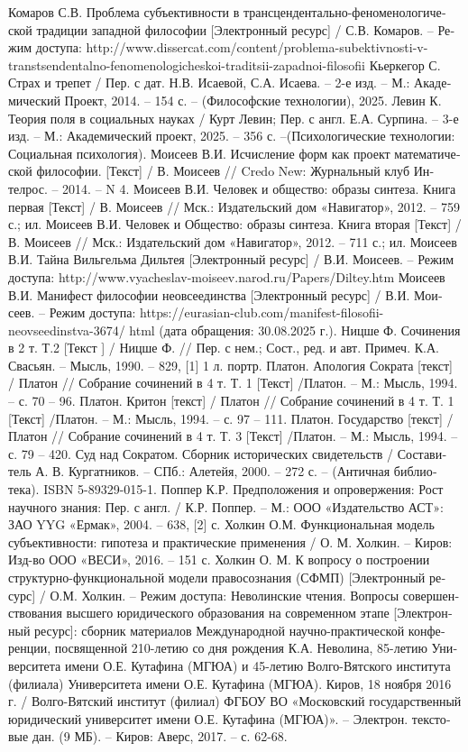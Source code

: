 \begin{russian}
    Комаров С.В. Проблема субъективности в трансцендентально-феноменологической традиции западной философии [Электронный ресурс] / С.В. Комаров. – Режим доступа: http://www.dissercat.com/content/problema-subektivnosti-v-transtsendentalno-fenomenologicheskoi-traditsii-zapadnoi-filosofii
    Кьеркегор С. Страх и трепет / Пер. с дат. Н.В. Исаевой, С.А. Исаева. – 2-е изд. – М.: Академический Проект, 2014. – 154 с. – (Философские технологии), 2025.
    Левин К. Теория поля в социальных науках / Курт Левин; Пер. с англ. Е.А. Сурпина. – 3-е изд.  – М.: Академический проект, 2025. – 356 с. –(Психологические технологии: Социальная психология).  
    Моисеев В.И. Исчисление форм как проект математической философии. [Текст] / В. Моисеев // Credo New: Журнальный клуб Интелрос. – 2014. – N 4.
    Моисеев В.И. Человек и общество: образы синтеза. Книга первая [Текст] / В. Моисеев // Мск.: Издательский дом «Навигатор», 2012. – 759 с.; ил.
    Моисеев В.И. Человек и Общество: образы синтеза. Книга вторая [Текст] / В. Моисеев // Мск.: Издательский дом «Навигатор», 2012. – 711 с.; ил.
    Моисеев В.И. Тайна Вильгельма Дильтея [Электронный ресурс] / В.И. Моисеев. – Режим доступа:  http://www.vyacheslav-moiseev.narod.ru/Papers/Diltey.htm
    Моисеев В.И. Манифест философии неовсеединства [Электронный ресурс] / В.И. Моисеев. – Режим доступа: https://eurasian-club.com/manifest-filosofii-neovseedinstva-3674/ html (дата обращения: 30.08.2025 г.).
    Ницше Ф. Сочинения в 2 т. Т.2 [Текст ] / Ницше Ф. // Пер. с нем.; Сост., ред. и авт. Примеч. К.А. Свасьян. – Мысль, 1990. – 829, [1] 1 л. портр.
    Платон. Апология Сократа [текст] / Платон // Собрание сочинений в 4 т. Т. 1 [Текст] /Платон. – М.: Мысль, 1994. – с. 70 – 96.
    Платон. Критон [текст] / Платон // Собрание сочинений в 4 т. Т. 1 [Текст] /Платон. – М.: Мысль, 1994. – с. 97 – 111.
    Платон. Государство [текст] / Платон // Собрание сочинений в 4 т. Т. 3 [Текст] /Платон. – М.: Мысль, 1994. – с. 79 – 420.
    Суд над Сократом. Сборник исторических свидетельств / Составитель    А. В. Кургатников. – СПб.: Алетейя, 2000. – 272 с. – (Античная   библиотека). ISBN 5-89329-015-1.  
    Поппер К.Р. Предположения и опровержения: Рост научного знания: Пер. с англ. / К.Р. Поппер. – М.: ООО «Издательство АСТ»: ЗАО YYG «Ермак», 2004. – 638, [2] с.
    Холкин О.М. Функциональная модель субъективности: гипотеза и практические применения / О. М. Холкин. – Киров: Изд-во ООО «ВЕСИ», 2016. – 151 с.
    Холкин О. М. К вопросу о построении структурно-функциональной модели правосознания (СФМП) [Электронный ресурс] / О.М. Холкин. – Режим доступа: Неволинские чтения. Вопросы совершенствования высшего юридического образования на современном этапе [Электронный ресурс]: сборник материалов Международной научно-практической конференции, посвященной 210-летию со дня рождения К.А. Неволина, 85-летию Университета имени О.Е. Кутафина (МГЮА) и 45-летию Волго-Вятского института (филиала) Университета имени О.Е. Кутафина (МГЮА). Киров, 18 ноября 2016 г. / Волго-Вятский институт (филиал) ФГБОУ ВО «Московский государственный юридический университет имени О.Е. Кутафина (МГЮА)». – Электрон. текстовые дан. (9 МБ). – Киров: Аверс, 2017. – с. 62-68.


\end{russian}
